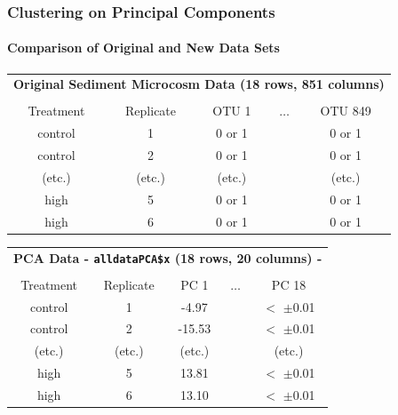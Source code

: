 \documentclass[10pt]{beamer}
\begin{document}
\begin{frame}[fragile]
\frametitle{Clustering on Principal Components}
\framesubtitle{Comparison of Original and New Data Sets}


\begin{center}
{\scriptsize
\begin{tabular}{ccccc}
\multicolumn{5}{c}{\bf Original Sediment Microcosm Data (18 rows, 851 columns)}\\
\multicolumn{5}{c}{ }\\
Treatment & Replicate & OTU 1  & $\ldots$ & OTU 849\\\hline
control   & 1         & 0 or 1   &        & 0 or 1\\
control   & 2         & 0 or 1   &        & 0 or 1\\
(etc.)    & (etc.)    & (etc.)   &        & (etc.) \\      
high      & 5         & 0 or 1   &        & 0 or 1\\
high      & 6         & 0 or 1   &        & 0 or 1\\\hline
\end{tabular}

\vspace{8ex}

\begin{tabular}{ccccc}
\multicolumn{5}{c}{\bf PCA Data - {\color{red} \tt alldataPCA\$x} (18 rows, 20 columns) - }\\
\multicolumn{5}{c}{ }\\
Treatment & Replicate & PC 1      & $\ldots$ & PC 18\\ \hline
control   & 1         & -4.97    &        & $<$ $\pm$0.01\\
control   & 2         & -15.53   &        & $<$ $\pm$0.01\\
(etc.)    & (etc.)    & (etc.)   &        & (etc.) \\      
high      & 5         & 13.81    &        & $<$ $\pm$0.01\\
high      & 6         & 13.10    &        & $<$ $\pm$0.01\\\hline
\end{tabular}


}
\end{center}

\end{frame}
\end{document}
